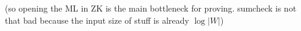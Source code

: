 (so opening the ML in ZK is the main bottleneck for proving. sumcheck is not that bad because the input size of stuff is already $\log|W|$)
